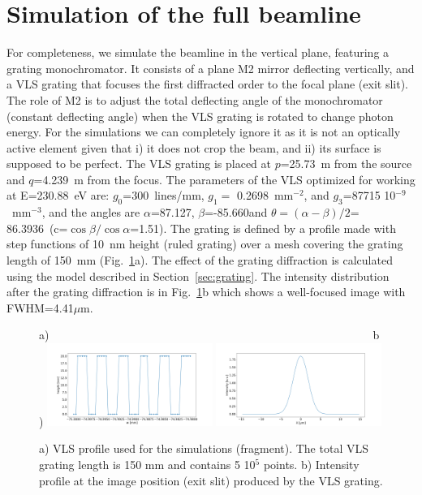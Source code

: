 \documentclass[preprint]{iucr}
\begin{document}
%
%
%
\section{Simulation of the full beamline}
\label{sec:2D}

For completeness, we simulate the beamline in the vertical plane, featuring a grating monochromator. It consists of a plane M2 mirror deflecting vertically, and a VLS grating that focuses the first diffracted order to the focal plane (exit slit). The role of M2 is to adjust the total deflecting angle of the monochromator (constant deflecting angle) when the VLS grating is rotated to change photon energy. For the simulations we can completely ignore it as it is not an optically active element given that i) it does not crop the beam, and ii) its surface is supposed to be perfect. The VLS grating is placed at $p$=25.73~m from the source and $q$=4.239~m from the focus. The parameters of the VLS optimized for working at E=230.88~eV are: $g_0$=300~lines/mm, $g_1=$ 0.2698~mm$^{-2}$, and $g_3$=87715 10${^{-9}}$~mm$^{-3}$, and the angles are $\alpha$=87.127\textdegree, $\beta$=-85.660\textdegree and $\theta=(\alpha-\beta)/2$= 86.3936\textdegree ~(c=$\cos \beta / \cos \alpha$=1.51). The grating is defined by a profile made with step functions of 10~nm height (ruled grating) over a mesh covering the grating length of 150~mm (Fig.~\ref{fig:grating}a). The effect of the grating diffraction is calculated using the model described in Section~\ref{sec:grating}. The intensity distribution after the grating diffraction is in Fig.~\ref{fig:grating}b which shows a well-focused image with FWHM=4.41$\mu$m.

  \begin{figure}
  \label{fig:grating} 
  \begin{flushleft}

  a)~~~~~~~~~~~~~~~~~~~~~~~~~~~~~~~~~~~~~~~~~~~~~~~~~~~~~~~~~b)
  \includegraphics[width=0.48\textwidth]{figures/grating.png} 
   \includegraphics[width=0.48\textwidth]{figures/intensitygrating.png}
  \end{flushleft}
  \caption{ a) VLS profile used for the simulations (fragment). The total VLS grating length is 150 mm and contains 5 10$^5$ points. b) Intensity profile at the image position (exit slit) produced by the VLS grating.}
  \end{figure}
\end{document}

